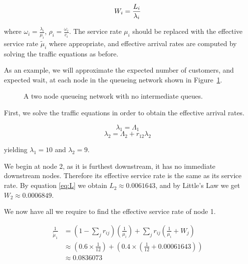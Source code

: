 \documentclass{article}
\begin{document}
\begin{equation}
    W_i = {L_i \over \lambda_i}
\end{equation}

where $\omega_i = \frac{\lambda_i}{\mu_i}$, $\rho_i = \frac{\omega_i}{c_i}$.
The service rate $\mu_i$ should be replaced with the effective service rate $\tilde{\mu}_i$ where appropriate, and effective arrival rates are computed by solving the traffic equations as before.

As an example, we will approximate the expected number of customers, and expected wait, at each node in the queueing network shown in Figure~\ref{fig:approxnet}.

\begin{figure}[H]
    
    \caption{A two node queueing network with no intermediate queues.}
    \label{fig:approxnet}
\end{figure}

First, we solve the traffic equations in order to obtain the effective arrival rates.

\begin{equation*}
    \lambda_1 = \Lambda_1
\end{equation*}
\begin{equation*}
    \lambda_2 = \Lambda_2 + r_{12} \lambda_2
\end{equation*}

yielding $\lambda_1 = 10$ and $\lambda_2 = 9$.

We begin at node 2, as it is furthest downstream, it has no immediate downstream nodes.
Therefore its effective service rate is the same as its service rate.
By equation \eqref{eq:L} we obtain $L_2 \approx 0.0061643$, and by Little's Law we get $W_2 \approx 0.0006849$.

We now have all we require to find the effective service rate of node 1.

\begin{equation*}
    \begin{split}
    \frac{1}{\tilde{\mu}_1} & = \left( 1 - \sum_j r_{ij} \right) \left( \frac{1}{\mu_i} \right) + \sum_j r_{ij} \left( \frac{1}{\mu_i} + W_j \right) \\
    & \approx \left( 0.6 \times \frac{1}{12} \right) + \left( 0.4 \times \left(
    \frac{1}{12} + 0.00061643 \right) \right) \\ %
    & \approx 0.0836073
    \end{split}
\end{equation*}
\end{document}
